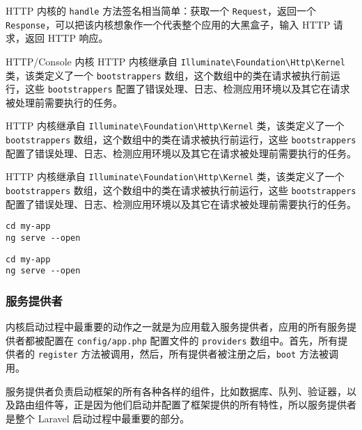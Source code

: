 \documentclass{progartcn}
\begin{document}
HTTP 内核的 \verb|handle| 方法签名相当简单：获取一个 \verb|Request|，返回一个 \verb|Response|，可以把该内核想象作一个代表整个应用的大黑盒子，输入 HTTP 请求，返回 HTTP 响应。

\begin{titledbox}{HTTP/Console 内核}
HTTP 内核继承自 \verb|Illuminate\Foundation\Http\Kernel| 类，该类定义了一个 \verb|bootstrappers| 数组，这个数组中的类在请求被执行前运行，这些 \verb|bootstrappers| 配置了错误处理、日志、检测应用环境以及其它在请求被处理前需要执行的任务。
\end{titledbox}

\begin{notebox}
  HTTP 内核继承自 \verb|Illuminate\Foundation\Http\Kernel| 类，该类定义了一个 \verb|bootstrappers| 数组，这个数组中的类在请求被执行前运行，这些 \verb|bootstrappers| 配置了错误处理、日志、检测应用环境以及其它在请求被处理前需要执行的任务。
\end{notebox}

\begin{importantbox}
  HTTP 内核继承自 \verb|Illuminate\Foundation\Http\Kernel| 类，该类定义了一个 \verb|bootstrappers| 数组，这个数组中的类在请求被执行前运行，这些 \verb|bootstrappers| 配置了错误处理、日志、检测应用环境以及其它在请求被处理前需要执行的任务。
\end{importantbox}

\begin{shellbox}
\begin{verbatim}
cd my-app
ng serve --open
\end{verbatim}
\end{shellbox}

\begin{shelloutputbox}
\begin{verbatim}
cd my-app
ng serve --open
\end{verbatim}
\end{shelloutputbox}


\subsubsection{服务提供者}

内核启动过程中最重要的动作之一就是为应用载入服务提供者，应用的所有服务提供者都被配置在 \verb|config/app.php| 配置文件的 \verb|providers| 数组中。首先，所有提供者的 \verb|register| 方法被调用，然后，所有提供者被注册之后，\verb|boot| 方法被调用。

服务提供者负责启动框架的所有各种各样的组件，比如数据库、队列、验证器，以及路由组件等，正是因为他们启动并配置了框架提供的所有特性，所以服务提供者是整个 Laravel 启动过程中最重要的部分。
\end{document}

